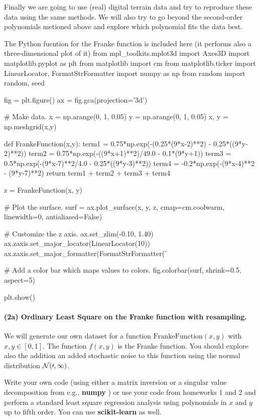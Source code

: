 \documentclass[%
oneside,                 %
final,                   %
10pt]{article}
\begin{document}
Finally we are going to use (real) digital terrain data and try to
reproduce these data using the same methods. We will also try to go
beyond the second-order polynomials metioned above and explore 
which polynomial fits the data best.


The Python fucntion for the Franke function is included here (it performs also a three-dimensional plot of it)
\bpycod
from mpl_toolkits.mplot3d import Axes3D
import matplotlib.pyplot as plt
from matplotlib import cm
from matplotlib.ticker import LinearLocator, FormatStrFormatter
import numpy as np
from random import random, seed

fig = plt.figure()
ax = fig.gca(projection='3d')

# Make data.
x = np.arange(0, 1, 0.05)
y = np.arange(0, 1, 0.05)
x, y = np.meshgrid(x,y)


def FrankeFunction(x,y):
    term1 = 0.75*np.exp(-(0.25*(9*x-2)**2) - 0.25*((9*y-2)**2))
    term2 = 0.75*np.exp(-((9*x+1)**2)/49.0 - 0.1*(9*y+1))
    term3 = 0.5*np.exp(-(9*x-7)**2/4.0 - 0.25*((9*y-3)**2))
    term4 = -0.2*np.exp(-(9*x-4)**2 - (9*y-7)**2)
    return term1 + term2 + term3 + term4


z = FrankeFunction(x, y)

# Plot the surface.
surf = ax.plot_surface(x, y, z, cmap=cm.coolwarm,
                       linewidth=0, antialiased=False)

# Customize the z axis.
ax.set_zlim(-0.10, 1.40)
ax.zaxis.set_major_locator(LinearLocator(10))
ax.zaxis.set_major_formatter(FormatStrFormatter('%

# Add a color bar which maps values to colors.
fig.colorbar(surf, shrink=0.5, aspect=5)

plt.show()

\epycod


\paragraph{(2a) Ordinary Least Square on the Franke function  with resampling.}
We will generate our own dataset for a function
$\mathrm{FrankeFunction}(x,y)$ with $x,y \in [0,1]$. The function
$f(x,y)$ is the Franke function. You should explore also the addition
an added stochastic noise to this function using the normal
distribution $\cal{N}(0,1)$.

Write your own code (using either a matrix inversion or a singular
value decomposition from e.g., \textbf{numpy} ) or use your code from
homeworks 1 and 2 and perform a standard least square regression
analysis using polynomials in $x$ and $y$ up to fifth order. You can use \textbf{scikit-learn} as well.
\end{document}

